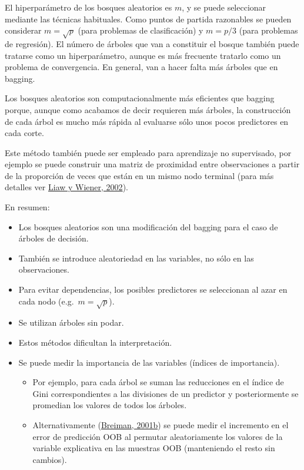 \documentclass[
  spanish,
]{book}
\theoremstyle{break}
\theoremstyle{definition}
\theoremstyle{definition}
\theoremstyle{definition}
\theoremstyle{definition}
\theoremstyle{remark}
\begin{document}
El hiperparámetro de los bosques aleatorios es \(m\), y se puede seleccionar mediante las técnicas habituales.
Como puntos de partida razonables se pueden considerar \(m = \sqrt{p}\) (para problemas de clasificación) y \(m = p/3\) (para problemas de regresión).
El número de árboles que van a constituir el bosque también puede tratarse como un hiperparámetro, aunque es más frecuente tratarlo como un problema de convergencia.
En general, van a hacer falta más árboles que en bagging.

Los bosques aleatorios son computacionalmente más eficientes que bagging porque, aunque como acabamos de decir requieren más árboles, la construcción de cada árbol es mucho más rápida al evaluarse sólo unos pocos predictores en cada corte.

Este método también puede ser empleado para aprendizaje no supervisado,
por ejemplo se puede construir una matriz de proximidad entre observaciones a partir de la proporción de veces que están en un mismo nodo terminal (para más detalles ver \protect\hyperlink{ref-liaw2002classification}{Liaw y Wiener, 2002}).

En resumen:

\begin{itemize}
\item
  Los bosques aleatorios son una modificación del bagging para el caso de árboles de decisión.
\item
  También se introduce aleatoriedad en las variables, no sólo en las observaciones.
\item
  Para evitar dependencias, los posibles predictores se seleccionan al azar en cada nodo (e.g.~\(m=\sqrt{p}\)).
\item
  Se utilizan árboles sin podar.
\item
  Estos métodos dificultan la interpretación.
\item
  Se puede medir la importancia de las variables (índices de importancia).

  \begin{itemize}
  \item
    Por ejemplo, para cada árbol se suman las reducciones en el
    índice de Gini correspondientes a las divisiones de un
    predictor y posteriormente se promedian los valores de todos
    los árboles.
  \item
    Alternativamente (\protect\hyperlink{ref-breiman2001statistical}{Breiman, 2001b}) se puede medir el incremento en el error de
    predicción OOB al permutar aleatoriamente los valores de la
    variable explicativa en las muestras OOB (manteniendo el resto
    sin cambios).
  \end{itemize}
\end{itemize}
\end{document}
